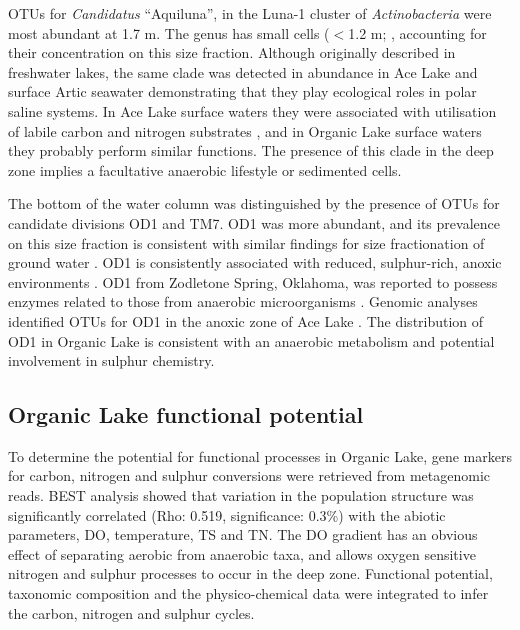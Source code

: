 \acp{OTU} for \emph{Candidatus} “Aquiluna”, in the Luna-1 cluster of \emph{Actinobacteria} \cite{Hahn2004, Hahn2009} were most abundant at 1.7 m. 
The genus has small cells ($<$1.2 \textmu{}m; \cite{Hahn2009}, accounting for their concentration on this size fraction. 
Although originally described in freshwater lakes, the same clade was detected in abundance in Ace Lake \cite{Lauro2011} and surface Artic seawater \cite{Kang2012} demonstrating that they play ecological roles in polar saline systems. 
In Ace Lake surface waters they were associated with utilisation of labile carbon and nitrogen substrates \cite{Lauro2011}, and in Organic Lake surface waters they probably perform similar functions. 
The presence of this clade in the deep zone implies a facultative anaerobic lifestyle or sedimented cells. 

The bottom of the water column was distinguished by the presence of \acp{OTU} for candidate divisions OD1 and TM7. 
OD1 was more abundant, and its prevalence on this size fraction is consistent with similar findings for size fractionation of ground water \cite{Miyoshi2005}. 
OD1 is consistently associated with reduced, sulphur-rich, anoxic environments \cite{Harris2004, Elshahed2005}. 
OD1 from Zodletone Spring, Oklahoma, was reported to possess enzymes related to those from anaerobic microorganisms \cite{Elshahed2005}. 
Genomic analyses identified \acp{OTU} for OD1 in the anoxic zone of Ace Lake \cite{Lauro2011}. 
The distribution of OD1 in Organic Lake is consistent with an anaerobic metabolism and potential involvement in sulphur chemistry. 


\subsection{Organic Lake functional potential}
To determine the potential for functional processes in Organic Lake, gene markers for carbon, nitrogen and sulphur conversions  were retrieved from metagenomic reads. 
BEST analysis showed that variation in the population structure was significantly correlated (Rho: 0.519, significance: 0.3\%) with the abiotic parameters, \ac{DO}, temperature, \ac{TS} and \ac{TN}. 
The \ac{DO} gradient has an obvious effect of separating aerobic from anaerobic taxa, and allows oxygen sensitive nitrogen and sulphur processes to occur in the deep zone. 
Functional potential, taxonomic composition and the physico-chemical data were integrated to infer the carbon, nitrogen and sulphur cycles.

